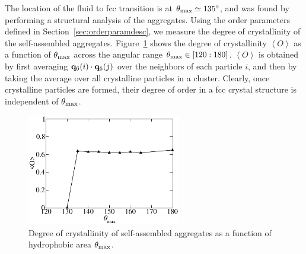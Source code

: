 The location of the fluid to fcc transition is at $\theta_{\rm max}\simeq 135^{\circ}$, and was found by performing a structural analysis of the aggregates. 
Using the order parameters defined in Section~\ref{sec:orderparamdesc}, we measure the degree of crystallinity of the self-assembled aggregates.
Figure~\ref{fig:q6q6} shows the degree of crystallinity $\left<O\right>$ as a function of  $\theta_{\rm max}$ across the angular range $\theta_{\rm max}\in[120:180]$.
$\left<O\right>$ is obtained by first averaging ${\bf q}_6(i)\cdot {\bf q}_6(j)$ over the neighbors of each particle $i$, and then by taking the average over all crystalline particles in a cluster. 
Clearly, once crystalline particles are formed, their degree of order in a fcc crystal structure is independent of $\theta_{\rm max}$.
\begin{figure}
	\begin{center}\includegraphics[width=0.6\textwidth]{janus/q6q6}\end{center}
	\caption[Degree of crystallinity of aggregates vs. hydrophobic area]{Degree of crystallinity of self-assembled aggregates as a function of hydrophobic area $\theta_{\rm max}$.}
	\label{fig:q6q6}
\end{figure}

